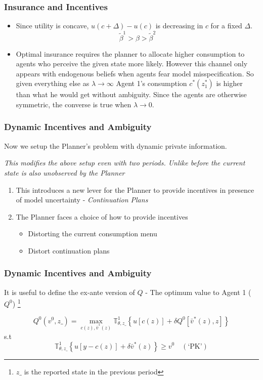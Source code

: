 \documentclass{beamer}
\theoremstyle{definition}
\begin{document}
	
	
	\begin{frame}
	\frametitle{Insurance and Incentives} 
	\begin{itemize}
	\item Since utility is concave, $u(c+\Delta)-u(c)$ is decreasing in  $c$  for a fixed $\Delta$. 
		\[\tilde{\beta}^1 > \beta > \tilde{\beta}^2\]
	
	
	\item Optimal insurance requires the planner to allocate higher consumption to agents who perceive the given state more likely. However this channel only appears with endogenous beliefs when agents fear model misspecification. So given everything else as $\lambda \to \infty $ Agent 1's consumption $c^*(z^*_1)$ is higher than what he would get without ambiguity. Since the agents are otherwise symmetric, the converse is true when $\lambda \to 0$. 
\end{itemize}

\end{frame}


\begin{frame}
\frametitle{Dynamic Incentives and Ambiguity}
Now we setup the Planner's problem with dynamic private information.

\emph{This modifies the above setup even with two periods. Unlike before the current state is also unobserved by the Planner}

\begin{enumerate}
	\item This introduces a new lever for the Planner to provide incentives in presence of model uncertainty - \emph{Continuation Plans}
	\item The Planner faces a choice of how to provide incentives 
	
\begin{itemize}
	\item Distorting  the current consumption menu
	\item Distort continuation plans
\end{itemize}

\end{enumerate}
\end{frame}


\begin{frame}
\frametitle{Dynamic Incentives and Ambiguity}
It is useful to define the ex-ante version of $Q$ - The optimum value to Agent 1 ($Q^0$)
\footnote{$z\_$ is the reported state in the previous period}

\[Q^0(v^0,z \_)=\max_{c(z),\bar{v}^*(z)}{\mathbb{T}^1_{\theta,z\_}\left\{ u[c(z)]+\delta Q^{0}[\bar{v}^{*}(z),z]\right\}}\] 
s.t
\[\mathbb{T}^1_{\theta,z\_}\left\{ u[y-c(z)]+\delta \bar{v}^{*}(z)\right\}\geq v^0 \quad (\text{`PK'})\]

\end{frame}
\end{document}
